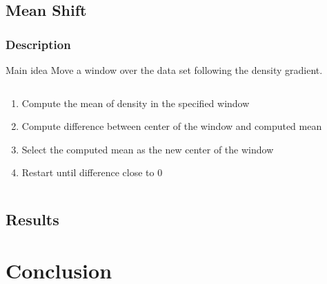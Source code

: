 \documentclass[10p]{beamer}
\begin{document}
\subsection{Mean Shift}
\begin{frame}
\frametitle{Description}
\begin{block}{Main idea}
Move a window over the data set following the density gradient.
\end{block}
\begin{columns}
\begin{column}{0.6\textwidth}
\begin{enumerate}
\item Compute the mean of density in the specified window
\item Compute difference between center of the window and computed mean
\item Select the computed mean as the new center of the window
\item Restart until difference close to 0
\end{enumerate}
\end{column}
\begin{column}{0.4\textwidth}
\end{column}
\end{columns}
\end{frame}
\subsection{Results}
\begin{frame}

\end{frame}
\section{Conclusion}
\begin{frame}
\end{frame}
\end{document}

